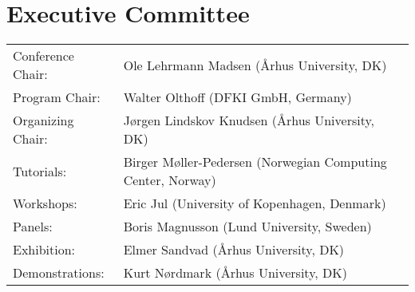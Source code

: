\documentclass{llncs}
\begin{document}
\section*{Executive Committee}
\begin{tabular}{@{}p{5cm}@{}p{7.2cm}@{}}
Conference Chair:&Ole Lehrmann Madsen (\AA rhus University, DK)\\
Program Chair:   &Walter Olthoff (DFKI GmbH, Germany)\\
Organizing Chair:&J\o rgen Lindskov Knudsen (\AA rhus University, DK)\\
Tutorials:&Birger M\o ller-Pedersen\hfil\break
(Norwegian Computing Center, Norway)\\
Workshops:&Eric Jul (University of Kopenhagen, Denmark)\\
Panels:&Boris Magnusson (Lund University, Sweden)\\
Exhibition:&Elmer Sandvad (\AA rhus University, DK)\\
Demonstrations:&Kurt N\o rdmark (\AA rhus University, DK)
\end{tabular}
%
\end{document}
